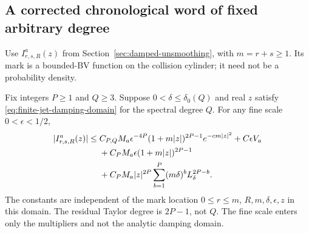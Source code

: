 \subsection{A corrected chronological word of fixed arbitrary degree}
Use $I^a_{r,s,R}(z)$ from Section~\ref{sec:damped-unsmoothing},
with $m=r+s\ge1$. Its mark is a bounded-BV function on the collision
cylinder; it need not be a probability density.

\begin{theorem}
\label{thm:high-order-damped-unsmoothing}
Fix integers $P\ge1$ and $Q\ge3$. Suppose $0<\delta\le\delta_0(Q)$
and real $z$ satisfy \eqref{eq:finite-jet-damping-domain} for the
spectral degree $Q$. For any fine scale $0<\epsilon<1/2$,
\begin{align}
 |I^a_{r,s,R}(z)|\le{}&
 C_{P,Q}M_a\epsilon^{-4P}(1+m|z|)^{2P-1}e^{-cm|z|^2}
       +C\epsilon V_a\notag\\
 &+C_PM_a\epsilon(1+m|z|)^{2P-1}\notag\\
 &+C_PM_a|z|^{2P}
             \sum_{b=1}^{P}(m\delta)^bL_\delta^{2P-b}.
 \label{eq:high-order-damped-unsmoothing}
\end{align}
The constants are independent of the mark location $0\le r\le m$,
$R,m,\delta,\epsilon,z$ in this domain. The residual Taylor degree
is $2P-1$, not $Q$. The fine scale enters only the multipliers and
not the analytic damping domain.
\end{theorem}
